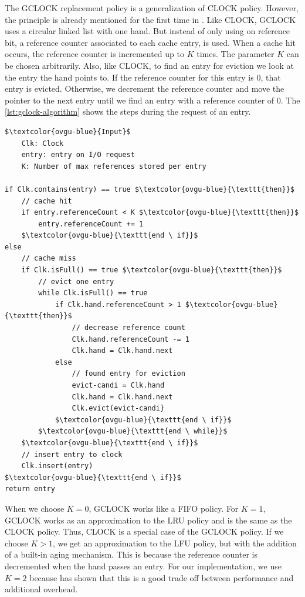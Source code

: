 \documentclass[
	12pt,
	a4paper,
	abstract,
	bibliography=totoc,
	chapterprefix,
	headings=openright,
	numbers=endperiod,
	parskip=half,
	twoside,
]{scrreprt}
\begin{document}
The GCLOCK replacement policy \cite{smith1978sequentiality} is a generalization of CLOCK policy.
However, the principle is already mentioned for the first time in \cite{corbato1968paging}.
Like CLOCK, GCLOCK uses a circular linked list with one hand.
But instead of only using on reference bit, a reference counter associated to each cache entry, is used.
When a cache hit occurs, the reference counter is incremented up to $K$ times.
The parameter $K$ can be chosen arbitrarily.
Also, like CLOCK, to find an entry for eviction we look at the entry the hand points to.
If the reference counter for this entry is 0, that entry is evicted.
Otherwise, we decrement the reference counter and move the pointer to the next entry 
until we find an entry with a reference counter of 0.
The \cref{lst:gclock-algorithm} shows the steps during the request of an entry.

\bigskip

\begin{lstlisting}[mathescape=true,caption=GCLOCK replacement algorithm in pseudocode,label=lst:gclock-algorithm]
$\textcolor{ovgu-blue}{Input}$
	Clk: Clock
	entry: entry on I/O request
	K: Number of max references stored per entry

if Clk.contains(entry) == true $\textcolor{ovgu-blue}{\texttt{then}}$
	// cache hit
	if entry.referenceCount < K $\textcolor{ovgu-blue}{\texttt{then}}$
		entry.referenceCount += 1
	$\textcolor{ovgu-blue}{\texttt{end \ if}}$
else
	// cache miss
	if Clk.isFull() == true $\textcolor{ovgu-blue}{\texttt{then}}$
		// evict one entry
		while Clk.isFull() == true
			if Clk.hand.referenceCount > 1 $\textcolor{ovgu-blue}{\texttt{then}}$
				// decrease reference count 
				Clk.hand.referenceCount -= 1
				Clk.hand = Clk.hand.next
			else
				// found entry for eviction 
				evict-candi = Clk.hand
				Clk.hand = Clk.hand.next
				Clk.evict(evict-candi}
			$\textcolor{ovgu-blue}{\texttt{end \ if}}$
		$\textcolor{ovgu-blue}{\texttt{end \ while}}$
	$\textcolor{ovgu-blue}{\texttt{end \ if}}$
	// insert entry to clock
	Clk.insert(entry)
$\textcolor{ovgu-blue}{\texttt{end \ if}}$
return entry 
\end{lstlisting}

When we choose $K = 0$, GCLOCK works like a FIFO policy.
For $K = 1$, GCLOCK works as an approximation to the LRU policy and is the same as the CLOCK policy.
Thus, CLOCK is a special case of the GCLOCK policy.
If we choose $K > 1$, we get an approximation to the LFU policy, but with the addition of a built-in aging mechanism.
This is because the reference counter is decremented when the hand passes an entry.
For our implementation, we use $K = 2$ because \cite{corbato1968paging} has shown that this is a good trade off between performance and additional overhead.
\end{document}
